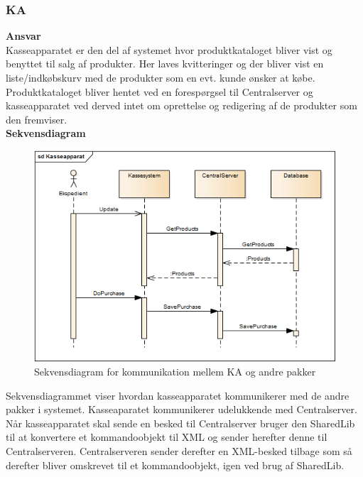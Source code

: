\subsubsection{\gls{KA}}

\textbf{Ansvar} \\
Kasseapparatet er den del af systemet hvor produktkataloget bliver vist og benyttet til salg af produkter. Her laves kvitteringer og der bliver vist en liste/indkøbskurv med de produkter som en evt. kunde ønsker at købe. Produktkataloget bliver hentet ved en forespørgsel til Centralserver og kasseapparatet ved derved intet om oprettelse og redigering af de produkter som den fremviser. \\

\textbf{Sekvensdiagram}
\begin{figure}[H]
	\centering
	\includegraphics[scale=0.7]{Systemarkitektur/LogiskView/Kasseapparat-sekvensdiagram}
	\caption{Sekvensdiagram for kommunikation mellem \gls{KA} og andre pakker}
	\label{fig:logview_kasse_sekvensdiagram}
\end{figure}

Sekvensdiagrammet viser hvordan kasseapparatet kommunikerer med de andre pakker i systemet. Kasseaparatet kommunikerer udelukkende med Centralserver. Når kasseapparatet skal sende en besked til Centralserver bruger den SharedLib til at konvertere et kommandoobjekt til XML og sender herefter denne til Centralserveren. Centralserveren sender derefter en XML-besked tilbage som så derefter bliver omskrevet til et kommandoobjekt, igen ved brug af SharedLib.

\newpage
